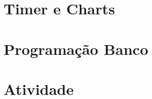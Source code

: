 \documentclass{beamer}
\begin{document}
	\begin{frame}
		\titlepage
	\end{frame}

	\begin{frame}%
	\tableofcontents%
	\end{frame}

	\section{Timer e Charts}

		
	
	
	\section{Programação Banco}
	
	
	
	
	
	\section{Atividade}
	
	
	
\end{document}
